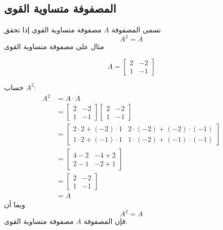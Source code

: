 	\subsection{المصفوفة متساوية القوى}
	تسمى المصفوفة $A$ مصفوفة متساوية القوى إذا تحقق
	\[
	A^2 = A
	\]
	مثال على مصفوفة متساوية القوى
	\begin{example}
		\[
		A=
		\begin{bmatrix}
			2 & -2\\
			1 & -1
		\end{bmatrix}
		\]
		
		حساب \(A^2\):
		\begin{align*}
			A^2 &= A \cdot A \\
			&=
			\begin{bmatrix}
				2 & -2\\
				1 & -1
			\end{bmatrix}
			\begin{bmatrix}
				2 & -2\\
				1 & -1
			\end{bmatrix} \\
			&=
			\begin{bmatrix}
				2\cdot 2 + (-2)\cdot 1 & 2\cdot(-2) + (-2)\cdot(-1) \\
				1\cdot 2 + (-1)\cdot 1 & 1\cdot(-2) + (-1)\cdot(-1)
			\end{bmatrix} \\
			&=
			\begin{bmatrix}
				4 - 2 & -4 + 2 \\
				2 - 1 & -2 + 1
			\end{bmatrix} \\
			&=
			\begin{bmatrix}
				2 & -2 \\
				1 & -1
			\end{bmatrix} \\
			&= A
		\end{align*}
		وبما أن
		\[
		A^2 = A
		\]
		فإن المصفوفة \(A\) مصفوفة متساوية القوى.
	\end{example}
